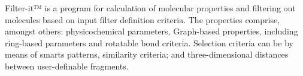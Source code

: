 Filter-it™ is a program for calculation of molecular properties and filtering out molecules based on input filter definition criteria. The properties comprise, amongst others: physicochemical parameters, Graph-based properties, including ring-based parameters and rotatable bond criteria. Selection criteria can be by means of smarts patterns, similarity criteria; and three-dimensional distances between user-definable fragments.